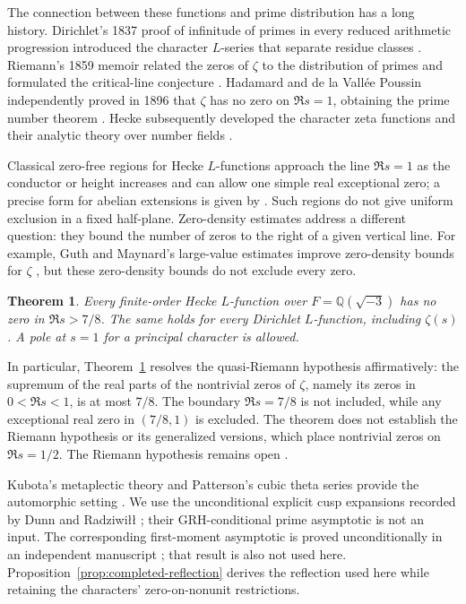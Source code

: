 \documentclass[11pt,a4paper]{article}
\numberwithin{equation}{section}
\numberwithin{figure}{section}
\newtheorem{theorem}{Theorem}[section]
\theoremstyle{definition}
\theoremstyle{remark}
\begin{document}
The connection between these functions and prime distribution has a
long history. Dirichlet's 1837 proof of infinitude of primes in every
reduced arithmetic progression introduced the character $L$-series
that separate residue classes \cite{Dirichlet}. Riemann's 1859 memoir
related the zeros of $\zeta$ to the distribution of primes and formulated
the critical-line conjecture \cite{Riemann}. Hadamard and de la
Vall\'ee Poussin independently proved in 1896 that $\zeta$ has no zero
on $\Re s=1$, obtaining the prime number theorem
\cite{Hadamard,ValleePoussin}. Hecke subsequently developed the
character zeta functions and their analytic theory over number fields
\cite{Hecke}.

Classical zero-free regions for Hecke $L$-functions approach the line
$\Re s=1$ as the conductor or height increases and can allow one
simple real exceptional zero; a precise form for abelian extensions is given
by \cite[Theorem 3.1]{TZ}. Such regions do not give uniform exclusion in
a fixed half-plane. Zero-density estimates address a different question:
they bound the number of zeros to the right of a given vertical line.
For example, Guth and Maynard's large-value estimates improve zero-density
bounds for $\zeta$ \cite[Theorem 1.2]{GM}, but these zero-density bounds
do not exclude every zero.

\begin{theorem}\label{thm:main}
Every finite-order Hecke $L$-function over
$F=\mathbb Q(\sqrt{-3})$ has no zero in $\Re s>7/8$.
The same holds for every Dirichlet $L$-function, including $\zeta(s)$.
A pole at $s=1$ for a principal character is allowed.
\end{theorem}

In particular, Theorem~\ref{thm:main} resolves the quasi-Riemann
hypothesis affirmatively: the supremum of the real parts of the
nontrivial zeros of $\zeta$, namely its zeros in $0<\Re s<1$, is at most
$7/8$. The boundary $\Re s=7/8$ is not included, while any exceptional
real zero in $(7/8,1)$ is excluded. The theorem does not establish the
Riemann hypothesis or its generalized versions, which place nontrivial
zeros on $\Re s=1/2$. The Riemann hypothesis remains open \cite{Clay}.

Kubota's metaplectic theory and Patterson's cubic theta series provide
the automorphic setting \cite{Kubota,Patterson}. We use the unconditional
explicit cusp expansions recorded by Dunn and Radziwi\l\l{}
\cite[Section 5 and Appendix A]{DR}; their GRH-conditional prime asymptotic
is not an input. The corresponding first-moment asymptotic is proved
unconditionally in an independent manuscript
\cite[Theorem~1.1]{OpenAICubicFirstMoment}; that result is also not used
here. Proposition~\ref{prop:completed-reflection} derives the
reflection used here while retaining the characters' zero-on-nonunit
restrictions.
\end{document}
